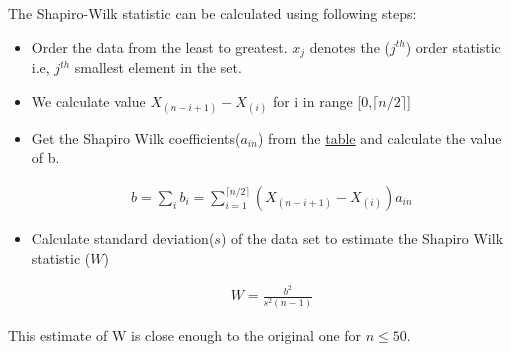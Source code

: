 \documentclass[10pt]{beamer}
\begin{document}
\begin{frame}{}
 The Shapiro-Wilk statistic can be calculated using following steps:
       \begin{itemize}
           \item Order the data from the least to greatest. $x_{j}$ denotes the ($j^{th}$) order statistic i.e, $j^{th}$ smallest element in the set.
           \item We calculate value $X_{(n-i+1)}-X_{(i)}$ for i in range [0,$\lceil{n/2}\rceil$]
           \item Get the Shapiro Wilk coefficients($a_{in}$) from the \href{https://github.com/cmaspi/verifying_CLT/tree/main/latex/report/images/coefficients}{table} and calculate the value of b.
            \begin{block}{}
            \begin{align}
              b=\sum_{i} b_{i} = \sum_{i=1}^{\lceil{n/2}\rceil} (X_{(n-i+1)}-X_{(i)}) a_{in} 
            \end{align}
            \end{block}
            \item Calculate standard deviation($s$) of the data set to estimate the Shapiro Wilk statistic ($W$)
            \begin{block}{}
            \begin{align}
                W = \frac{b^{2}}{s^{2}(n-1)}
            \end{align}
            \end{block}
       \end{itemize}
       This estimate of W is close enough to the original one for $n\leq50$.
\end{frame}
\end{document}
